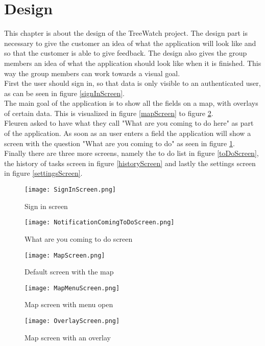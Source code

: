\section{Design}

This chapter is about the design of the TreeWatch project. The design part is necessary to give the customer an idea of what the application will look like and so that the customer is able to give feedback. The design also gives the group members an idea of what the application should look like when it is finished. This way the group members can work towards a visual goal. \\

First the user should sign in, so that data is only visible to an authenticated user, as can be seen in figure \ref{signInScreen}. \\
The main goal of the application is to show all the fields on a map, with overlays of certain data. This is visualized in figure \ref{mapScreen} to figure \ref{overlayScreen}. \\
Fleuren asked to have what they call "What are you coming to do here" as part of the application. As soon as an user enters a field the application will show a screen with the question "What are you coming to do" as seen in figure \ref{comingToDoScreen}. \\
Finally there are three more screens, namely the to do list in figure \ref{toDoScreen}, the history of tasks screen in figure \ref{historyScreen} and lastly the settings screen in figure \ref{settingsScreen}.

\begin{figure}[h]
	\centering
	\texttt{[image: SignInScreen.png]}
	\caption{Sign in screen}\label{signInScreen}
	\endminipage\hfill
	\centering
	\texttt{[image: NotificationComingToDoScreen.png]}
	\caption{What are you coming to do screen}\label{comingToDoScreen}
	\endminipage\hfill
\end{figure}

\begin{figure}[h]
	\centering
	\texttt{[image: MapScreen.png]}
	\caption{Default screen with the map}\label{mapScreen}
	\endminipage\hfill
	\centering
	\texttt{[image: MapMenuScreen.png]}
	\caption{Map screen with menu open}\label{mapMenuScreen}
	\endminipage\hfill
	\centering
	\texttt{[image: OverlayScreen.png]}
	\caption{Map screen with an overlay}\label{overlayScreen}
	\endminipage\hfill
\end{figure}

